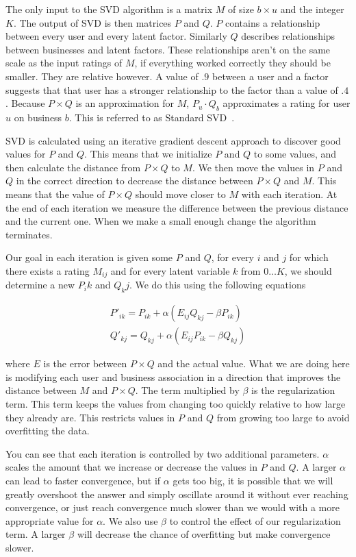 The only input to the SVD algorithm is a matrix $M$ of size $b \times u$ and the
integer $K$. The output of SVD is then matrices $P$ and $Q$. $P$ contains a
relationship between every user and every latent factor. Similarly $Q$ describes
relationships between businesses and latent factors. These relationships aren't
on the same scale as the input ratings of $M$, if everything worked correctly
they should be smaller. They are relative however. A value of $.9$ between a
user and a factor suggests that that user has a stronger relationship to the
factor than a value of $.4$. Because $P \times Q$ is an approximation for $M$,
$P_u \cdot Q_b$ approximates a rating for user $u$ on business $b$. This is
referred to as Standard SVD~\cite{netflix paper}.

SVD is calculated using an iterative gradient descent approach to discover good
values for $P$ and $Q$. This means that we initialize $P$ and $Q$ to some
values, and then calculate the distance from $P \times Q$ to $M$. We then move
the values in $P$ and $Q$ in the correct direction to decrease the distance
between $P \times Q$ and $M$. This means that the value of $P \times Q$ should
move closer to $M$ with each iteration. At the end of each iteration we measure
the difference between the previous distance and the current one. When we make
a small enough change the algorithm terminates.

Our goal in each iteration is given some $P$ and $Q$, for every $i$ and $j$ for
which there exists a rating $M_{ij}$ and for every latent variable $k$ from
$0\ldots K$, we should determine a new $P_ik$ and $Q_kj$. We do this using the
following equations

\[
\begin{array}{c}
P'_{ik}=P_{ik} + \alpha(E_{ij}Q_{kj}-\beta P_{ik}) \\
Q'_{kj}=Q_{kj} + \alpha(E_{ij}P_{ik}-\beta Q_{kj})
\end{array}
\]

\noindent where $E$ is the error between $P \times Q$ and the actual value. What
we are doing here is modifying each user and business association in a direction
that improves the distance between $M$ and $P \times Q$. The term multiplied by
$\beta$ is the regularization term. This term keeps the values from changing too
quickly relative to how large they already are. This restricts values in $P$ and
$Q$ from growing too large to avoid overfitting the data.

You can see that each iteration is controlled by two additional parameters.
$\alpha$ scales the amount that we increase or decrease the values in $P$ and
$Q$. A larger $\alpha$ can lead to faster convergence, but if $\alpha$ gets too
big, it is possible that we will greatly overshoot the answer and simply
oscillate around it without ever reaching convergence, or just reach
convergence much slower than we would with a more appropriate value for
$\alpha$. We also use $\beta$ to control the effect of our regularization term.
A larger $\beta$ will decrease the chance of overfitting but make convergence
slower.

